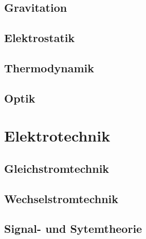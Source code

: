 \documentclass[a5paper]{report}
\begin{document}
		\chapter{Gravitation}
		

		\chapter{Elektrostatik}
		

		\chapter{Thermodynamik}
		

		\chapter{Optik}
		

	\part{Elektrotechnik}

		\chapter{Gleichstromtechnik}
		

		\chapter{Wechselstromtechnik}
		

		\chapter{Signal- und Sytemtheorie}
		

%
%
\end{document}
